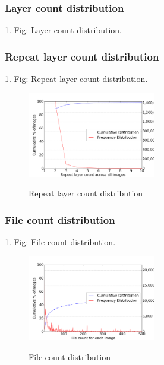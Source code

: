 \subsubsection{Layer count distribution}

1. Fig: Layer count distribution.


\subsubsection{Repeat layer count distribution}

1. Fig: Repeat layer count distribution.

\begin{figure}
	\centering
	\includegraphics[width=0.5\textwidth]{graphs/Repeat_layer_count_across_all_images}\\
	\caption{Repeat layer count distribution}\label{fig_image_size_compression}
\end{figure}

\subsubsection{File count distribution}

1. Fig: File count distribution.

\begin{figure}
	\centering
	\includegraphics[width=0.5\textwidth]{graphs/File_count_for_each_image.png}\\
	\caption{File count distribution}\label{fig_image_size_compression}
\end{figure}

